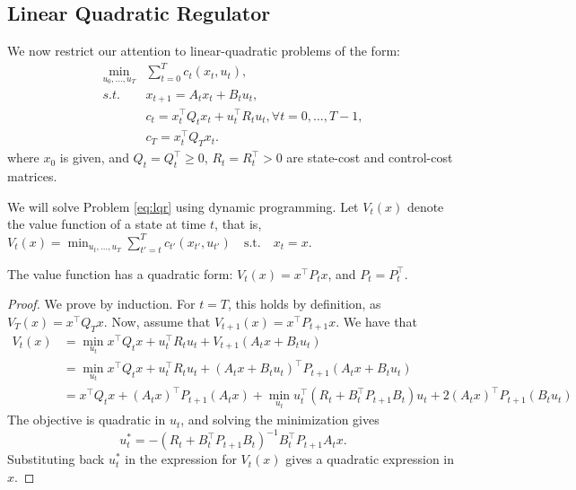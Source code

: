 \subsection{Linear Quadratic Regulator}

We now restrict our attention to linear-quadratic problems of the form:
\begin{equation}\label{eq:lqr}
    \begin{split}
        \min_{u_0,\dots,u_{T}} & \sum_{t=0}^T c_t(x_t, u_t), \\
        s.t. \quad & {x_{t + 1}} = A_t x_t + B_t u_t, \\
        & c_t = x_t^\top Q_t x_t + u_t^\top R_t u_t, \forall t=0,\dots,T-1, \\
        & c_T = x_t^\top Q_T x_t.
    \end{split}
\end{equation}
where $x_0$ is given, and $Q_t=Q_t^\top \geq 0$, $R_t = R_t^\top > 0 $ are state-cost and control-cost matrices.

We will solve Problem \ref{eq:lqr} using dynamic programming. Let $V_t(x)$ denote the value function of a state at time $t$, that is, $V_t(x) = \min_{u_t,\dots,u_T} \sum_{t'=t}^T c_{t'}(x_{t'}, u_{t'}) \quad \textrm{s.t.} \quad x_t = x$. 

\begin{proposition}\label{prop:lqr}
The value function has a quadratic form: $V_t(x) = x^\top P_t x$, and $P_t=P_t^\top$. 
\end{proposition}
\begin{proof}
We prove by induction. For $t=T$, this holds by definition, as $V_T(x) = x^\top Q_T x$. Now, assume that $V_{t+1}(x) = x^\top P_{t+1} x$. We have that 
\begin{equation*}
\begin{split}
        V_t(x) &= \min_{u_t} x^\top Q_t x + u_t^\top R_t u_t + V_{t+1}(A_t x + B_t u_t) \\
        &= \min_{u_t} x^\top Q_t x + u_t^\top R_t u_t + (A_t x + B_t u_t)^\top P_{t+1} (A_t x + B_t u_t) \\
        &= x^\top Q_t x + (A_t x)^\top P_{t+1} (A_t x) + \min_{u_t} u_t^\top (R_t + B_t^\top P_{t+1} B_t) u_t + 2(A_t x)^\top P_{t+1} (B_t u_t)
\end{split}
\end{equation*}
The objective is quadratic in $u_t$, and solving the minimization gives 
$$u_t^* = -(R_t + B_t^\top P_{t+1} B_t)^{-1} B_t^\top P_{t+1} A_t x. $$ 
Substituting back $u_t^*$ in the expression for $V_t(x)$ gives a quadratic expression in $x$.
\end{proof}

